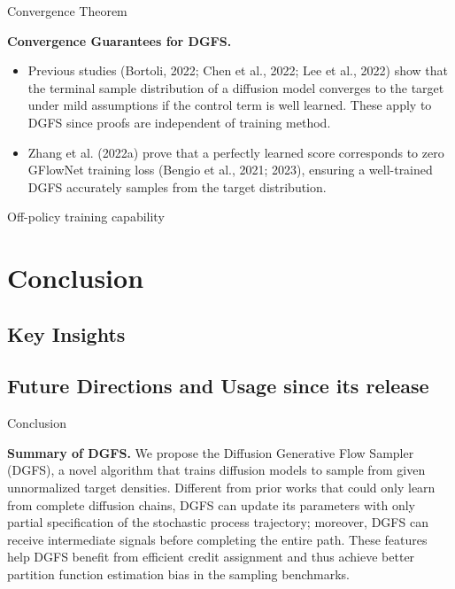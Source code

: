 \documentclass[aspectratio=169,xcolor=dvipsnames]{beamer}
\begin{document}
\begin{frame}[t]{Convergence Theorem}
\footnotesize

\textbf{Convergence Guarantees for DGFS.}
\begin{itemize}\itemsep2pt
  \item Previous studies (Bortoli, 2022; Chen et al., 2022; Lee et al., 2022) show that the terminal sample distribution of a diffusion model converges to the target under mild assumptions if the control term is well learned. These apply to DGFS since proofs are independent of training method.
  \item Zhang et al. (2022a) prove that a perfectly learned score corresponds to zero GFlowNet training loss (Bengio et al., 2021; 2023), ensuring a well-trained DGFS accurately samples from the target distribution.
\end{itemize}

\end{frame}

\begin{frame}[t]{Off-policy training capability}
    \footnotesize

\end{frame}



\section{Conclusion}

\subsection{Key Insights}

\subsection{Future Directions and Usage since its release}

\begin{frame}{Conclusion}
\footnotesize

\textbf{Summary of DGFS.} We propose the Diffusion Generative Flow Sampler (DGFS), a novel algorithm that trains diffusion models to sample from given unnormalized target densities. Different from prior works that could only learn from complete diffusion chains, DGFS can update its parameters with only partial specification of the stochastic process trajectory; moreover, DGFS can receive intermediate signals before completing the entire path. These features help DGFS benefit from efficient credit assignment and thus achieve better partition function estimation bias in the sampling benchmarks.

\end{frame}
\end{document}
